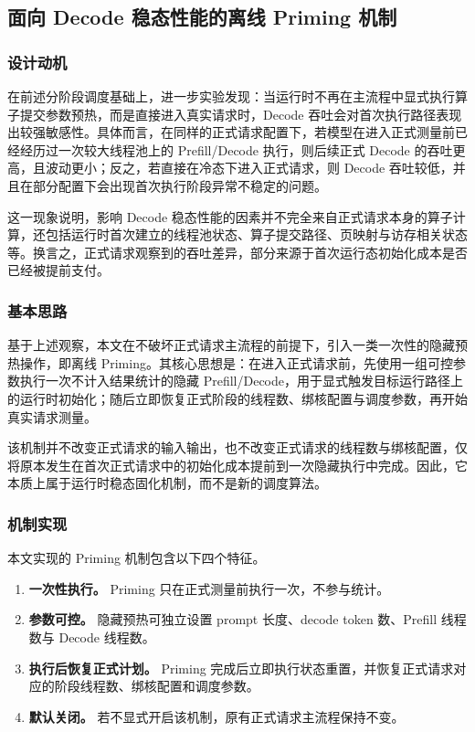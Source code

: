 \subsection{面向 Decode 稳态性能的离线 Priming 机制}

\subsubsection{设计动机}

在前述分阶段调度基础上，进一步实验发现：当运行时不再在主流程中显式执行算子提交参数预热，而是直接进入真实请求时，Decode 吞吐会对首次执行路径表现出较强敏感性。具体而言，在同样的正式请求配置下，若模型在进入正式测量前已经经历过一次较大线程池上的 Prefill/Decode 执行，则后续正式 Decode 的吞吐更高，且波动更小；反之，若直接在冷态下进入正式请求，则 Decode 吞吐较低，并且在部分配置下会出现首次执行阶段异常不稳定的问题。

这一现象说明，影响 Decode 稳态性能的因素并不完全来自正式请求本身的算子计算，还包括运行时首次建立的线程池状态、算子提交路径、页映射与访存相关状态等。换言之，正式请求观察到的吞吐差异，部分来源于首次运行态初始化成本是否已经被提前支付。

\subsubsection{基本思路}

基于上述观察，本文在不破坏正式请求主流程的前提下，引入一类一次性的隐藏预热操作，即离线 Priming。其核心思想是：在进入正式请求前，先使用一组可控参数执行一次不计入结果统计的隐藏 Prefill/Decode，用于显式触发目标运行路径上的运行时初始化；随后立即恢复正式阶段的线程数、绑核配置与调度参数，再开始真实请求测量。

该机制并不改变正式请求的输入输出，也不改变正式请求的线程数与绑核配置，仅将原本发生在首次正式请求中的初始化成本提前到一次隐藏执行中完成。因此，它本质上属于运行时稳态固化机制，而不是新的调度算法。

\subsubsection{机制实现}

本文实现的 Priming 机制包含以下四个特征。

\begin{enumerate}
  \item \textbf{一次性执行。} Priming 只在正式测量前执行一次，不参与统计。
  \item \textbf{参数可控。} 隐藏预热可独立设置 prompt 长度、decode token 数、Prefill 线程数与 Decode 线程数。
  \item \textbf{执行后恢复正式计划。} Priming 完成后立即执行状态重置，并恢复正式请求对应的阶段线程数、绑核配置和调度参数。
  \item \textbf{默认关闭。} 若不显式开启该机制，原有正式请求主流程保持不变。
\end{enumerate}

